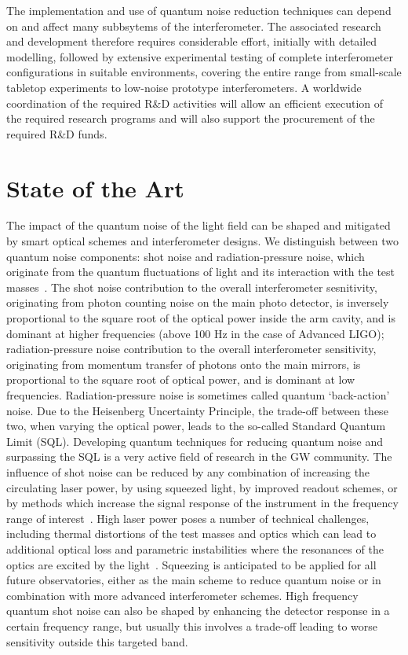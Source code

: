 The implementation and use of quantum noise reduction techniques can depend on and affect many subbsytems of the interferometer. The associated research and development therefore requires considerable effort, initially with detailed modelling, followed by extensive experimental testing of complete interferometer configurations in suitable environments, covering the entire range from small-scale tabletop experiments to low-noise prototype interferometers. A worldwide coordination of the required R\&D activities will allow an efficient execution of the required research programs and will also support the procurement of the required R\&D funds. 

\section{State of the Art}
The impact of the quantum noise of the light field can be shaped and mitigated by smart optical schemes and interferometer designs. We distinguish between two quantum noise components: shot noise and radiation-pressure noise, which originate from the quantum fluctuations of light and its interaction with the test masses~\cite{Cav1980}. The shot noise contribution to the overall interferometer sesnitivity, originating from photon counting noise on the main photo detector, is inversely proportional to the square root of the optical power inside the arm cavity, and is dominant at higher frequencies (above 100 Hz in the case of Advanced LIGO); radiation-pressure noise contribution to the overall interferometer sensitivity, originating from momentum transfer of photons onto the main mirrors, is proportional to the square root of optical power, and is dominant at low frequencies. Radiation-pressure noise is sometimes called quantum `back-action' noise. Due to the Heisenberg Uncertainty Principle, the trade-off between these two, when varying the optical power, leads to the so-called Standard Quantum Limit (SQL). Developing quantum techniques for reducing quantum noise and surpassing the SQL is a very active field of research in the GW community. 
The influence of shot noise can be reduced by any combination of increasing the circulating laser power, by using squeezed light, by improved readout schemes, or by methods which increase the signal response of the instrument in the frequency range of interest~\cite{StMe1991,Mizuno:RSE1993,Osamu:2006}. High laser power poses a number of technical challenges, including thermal distortions of the test masses and optics which can lead to additional optical loss and parametric instabilities where the resonances of the optics are excited by the light~\cite{BSV2001,Evans:2015raa}. Squeezing is anticipated to be applied for all future observatories, either as the main scheme to reduce quantum noise or in combination with more advanced interferometer schemes. High frequency quantum shot noise can also be shaped by enhancing the detector response in a certain frequency range, but usually this involves a trade-off leading to worse sensitivity outside this targeted band.  

